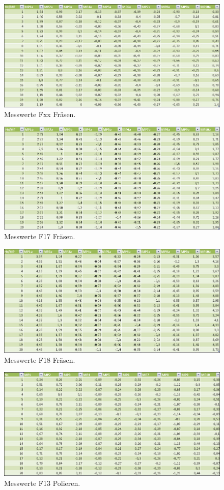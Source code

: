 \begin{figure}[H]
\centering
\includegraphics[width=.8\textwidth]{Fxxfraes}
\caption{Messwerte Fxx Fräsen.}
\label{Fxxfraes}
\end{figure}
\begin{figure}[H]
\centering
\includegraphics[width=.8\textwidth]{F17fraes}
\caption{Messwerte F17 Fräsen.}
\label{F17fraes}
\end{figure}
\begin{figure}[H]
\centering
\includegraphics[width=.8\textwidth]{F18fraes}
\caption{Messwerte F18 Fräsen.}
\label{F18 fraes}
\end{figure}
\begin{figure}[H]
\centering
\includegraphics[width=.8\textwidth]{F13polier}
\caption{Messwerte F13 Polieren.}
\label{F13polier}
\end{figure}
